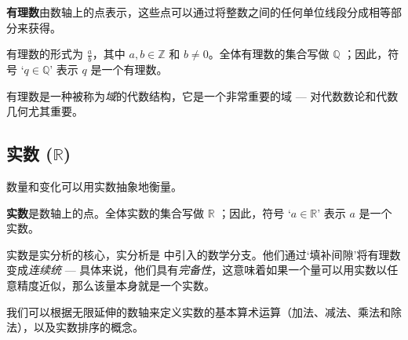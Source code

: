 \begin{definition}
\label{defRationalsInformal}
\textbf{有理数}由数轴上的点表示，这些点可以通过将整数之间的任何单位线段分成相等部分来获得。
\begin{center}
\end{center}
有理数的形式为 $\frac{a}{b}$，其中 $a,b \in \mathbb{Z}$ 和 $b \ne 0$。全体有理数的集合写做 $\mathbb{Q}$ ；因此，符号 `$q \in \mathbb{Q}$' 表示 $q$ 是一个有理数。
\end{definition}

有理数是一种被称为\textit{域}的代数结构，它是一个非常重要的域 --- 对代数数论和代数几何尤其重要。

\subsection*{实数 ($\mathbb{R}$)}

数量和变化可以用实数抽象地衡量。

\begin{definition}
\label{defRealsInformal}
\textbf{实数}是数轴上的点。全体实数的集合写做 $\mathbb{R}$ ；因此，符号 `$a \in \mathbb{R}$' 表示 $a$ 是一个实数。
\end{definition}

实数是实分析的核心，实分析是  中引入的数学分支。他们通过`填补间隙'将有理数变成\textit{连续统} --- 具体来说，他们具有\textit{完备性}，这意味着如果一个量可以用实数以任意精度近似，那么该量本身就是一个实数。

我们可以根据无限延伸的数轴来定义实数的基本算术运算（加法、减法、乘法和除法），以及实数排序的概念。


